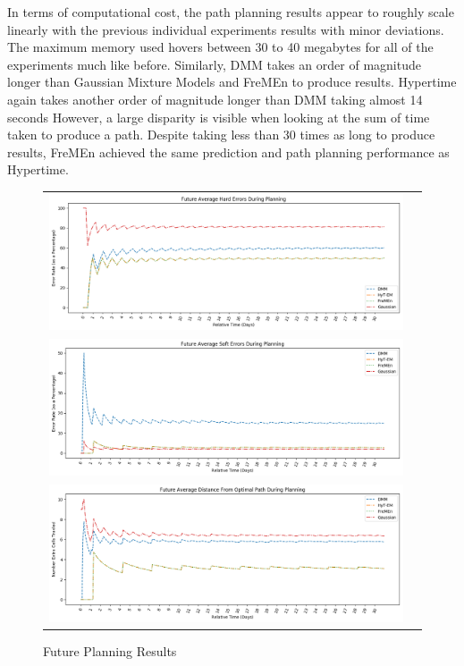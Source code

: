 In terms of computational cost, the path planning results appear to roughly
scale linearly with the previous individual experiments results with minor
deviations. The maximum memory used hovers between 30 to 40 megabytes for all
of the experiments much like before. Similarly, DMM takes an order of
magnitude longer than Gaussian Mixture Models and FreMEn to produce results.
Hypertime again takes another order of magnitude longer than DMM taking
almost 14 seconds However, a large disparity is visible when looking at the
sum of time taken to produce a path. Despite taking less than 30 times as long
to produce results, FreMEn achieved the same prediction and path planning
performance as Hypertime.


\begin{center}
  \begin{figure}[!Hp]
  \begin{tabular}{cc}
    {\includegraphics[width = 6in]{images/results/Future_Average_Hard_Errors_During_Planning.png}} \\
    {\includegraphics[width = 6in]{images/results/Future_Average_Soft_Errors_During_Planning.png}} \\
    {\includegraphics[width = 6in]{images/results/Future_Average_Distance_From_Optimal_Path_During_Planning.png}} \\
  \end{tabular}
  \caption{ Future Planning Results}
  \label{fig:G_FP_res}
\end{figure}


\end{center}
